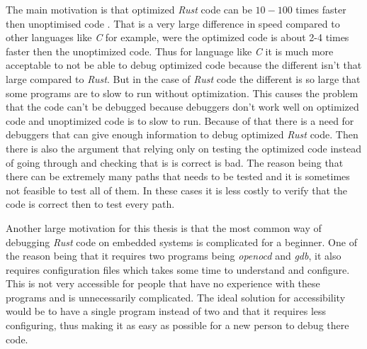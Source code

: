 


The main motivation is that optimized \emph{Rust} code can be $10-100$ times faster then unoptimised code \cite{perf-book}.
That is a very large difference in speed compared to other languages like \emph{C} for example, were the optimized code is about 2-4 times faster then the unoptimized code. %
Thus for language like \emph{C} it is much more acceptable to not be able to debug optimized code because the different isn't that large compared to \emph{Rust}.
But in the case of \emph{Rust} code the different is so large that some programs are to slow to run without optimization.
This causes the problem that the code can't be debugged because debuggers don't work well on optimized code and unoptimized code is to slow to run.
Because of that there is a need for debuggers that can give enough information to debug optimized \emph{Rust} code.
Then there is also the argument that relying only on testing the optimized code instead of going through and checking that is is correct is bad.
The reason being that there can be extremely many paths that needs to be tested and it is sometimes not feasible to test all of them.
In these cases it is less costly to verify that the code is correct then to test every path.


Another large motivation for this thesis is that the most common way of debugging \emph{Rust} code on embedded systems is complicated for a beginner.
One of the reason being that it requires two programs being \emph{openocd} and \emph{gdb}, it also requires configuration files which takes some time to understand and configure.
This is not very accessible for people that have no experience with these programs and is unnecessarily complicated.
The ideal solution for accessibility would be to have a single program instead of two and that it requires less configuring, thus making it as easy as possible for a new person to debug there code.


